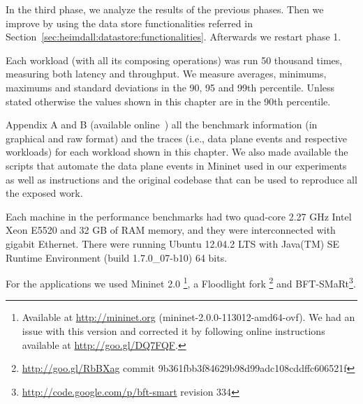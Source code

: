 In the third phase, we analyze the results of the previous phases.
Then we improve by using the data store functionalities referred in Section~\ref{sec:heimdall:datastore:functionalities}. 
Afterwards we restart phase 1. 

Each workload (with all its composing operations)  was run 50 thousand times, measuring both latency and throughput. 
We measure averages, minimums, maximums and standard deviations in the 90, 95 and 99th percentile. 
Unless stated otherwise the values shown in this chapter are in the 90th percentile. 

Appendix A and B (available online~\cite{support})  all the benchmark information (in graphical and raw format) and the traces (i.e., data plane events and respective workloads) for each workload shown in this chapter.  We also made available the scripts that automate the data plane events in Mininet used in our experiments as well as instructions and the original codebase that can be used to reproduce  all the exposed work. 

Each machine in the performance benchmarks had two quad-core 2.27 GHz Intel Xeon E5520 and 32 GB of RAM memory, and they were interconnected with gigabit Ethernet. 
There were running  Ubuntu 12.04.2 LTS with  Java(TM) SE Runtime Environment (build 1.7.0\_07-b10) 64 bits.

For the applications we  used Mininet 2.0 \footnote{Available at \url{http://mininet.org} (mininet-2.0.0-113012-amd64-ovf). We had an issue with this version and corrected it by following online instructions available at \url{http://goo.gl/DQ7FQF}.},  a Floodlight fork \footnote{\url{http://goo.gl/RbBXag} commit 9b361fbb3f84629b98d99adc108cddffc606521f} and  BFT-SMaRt\footnote{\url{http://code.google.com/p/bft-smart} revision 334}.  


